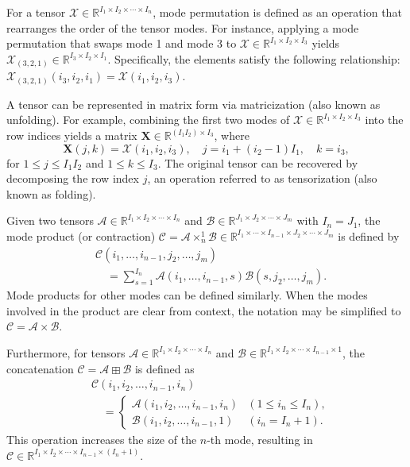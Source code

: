 \documentclass[a4paper, 11pt]{article}
\newcommand{\ttimes}[2]{\times_{#1}^{#2}}
\theoremstyle{plain}
\theoremstyle{definition}
\theoremstyle{remark}
\begin{document}
For a tensor $\mathcal{X} \in \mathbb{R}^{I_1 \times I_2 \times \cdots \times I_n}$, mode permutation is defined as an operation that rearranges the order of the tensor modes.
For instance, applying a mode permutation that swaps mode 1 and mode 3 to $\mathcal{X} \in \mathbb{R}^{I_1 \times I_2 \times I_3}$ yields $\mathcal{X}_{(3,2,1)} \in \mathbb{R}^{I_3 \times I_2 \times I_1}$.
Specifically, the elements satisfy the following relationship: $\mathcal{X}_{(3,2,1)}(i_3, i_2, i_1) = \mathcal{X}(i_1, i_2, i_3)$.

A tensor can be 
represented in matrix form via matricization (also known as unfolding).
For example, combining the first two modes of $\mathcal{X} \in \mathbb{R}^{I_1 \times I_2 \times I_3}$ into the row indices yields a matrix $\mathbf{X} \in \mathbb{R}^{(I_1 I_2) \times I_3}$, where
\begin{equation*}
\mathbf{X}(j, k) = \mathcal{X}(i_1, i_2, i_3), \quad j = i_1 + (i_2 - 1)I_1, \quad k = i_3,
\end{equation*}
for $1 \leq j \leq I_1 I_2$ and $1 \leq k \leq I_3$.
The original tensor can be recovered by decomposing the row index $j$, an operation referred to as tensorization (also known as folding).

Given two tensors $\mathcal{A} \in \mathbb{R}^{I_1 \times I_2 \times \cdots \times I_n}$ and $\mathcal{B} \in \mathbb{R}^{J_1 \times J_2 \times \cdots \times J_m}$ with $I_n = J_1$, the mode product (or contraction) $\mathcal{C} = \mathcal{A} \ttimes{n}{1} \mathcal{B} \in \mathbb{R}^{I_1 \times \cdots \times I_{n-1} \times J_2 \times \cdots \times J_m}$ is defined by
\begin{equation*}
\begin{split}
&\mathcal{C}(i_1, \ldots, i_{n-1}, j_2, \ldots, j_m) \\
&\quad = \sum_{s=1}^{I_n} \mathcal{A}(i_1, \ldots, i_{n-1}, s) \mathcal{B}(s, j_2, \ldots, j_m).
\end{split}
\end{equation*}
Mode products for other modes can be defined similarly.
When the modes involved in the product are clear from context, the notation may be simplified to $\mathcal{C} = \mathcal{A} \times \mathcal{B}$.

Furthermore, for tensors $\mathcal{A} \in \mathbb{R}^{I_1 \times I_2 \times \cdots \times I_n}$ and $\mathcal{B} \in \mathbb{R}^{I_1 \times I_2 \times \cdots \times I_{n-1} \times 1}$, the concatenation $\mathcal{C} = \mathcal{A} \boxplus \mathcal{B}$ is defined as
\begin{equation*}
\begin{split}
&\mathcal{C}(i_1, i_2, \ldots, i_{n-1}, i_n) \\
&\quad = \begin{cases}
\mathcal{A}(i_1, i_2, \ldots, i_{n-1}, i_n) & (1 \leq i_n \leq I_n), \\
\mathcal{B}(i_1, i_2, \ldots, i_{n-1}, 1) & (i_n = I_n + 1).
\end{cases}
\end{split}
\end{equation*}
This operation increases the size of the $n$-th mode, resulting in $\mathcal{C} \in \mathbb{R}^{I_1 \times I_2 \times \cdots \times I_{n-1} \times (I_n + 1)}$.
\end{document}
